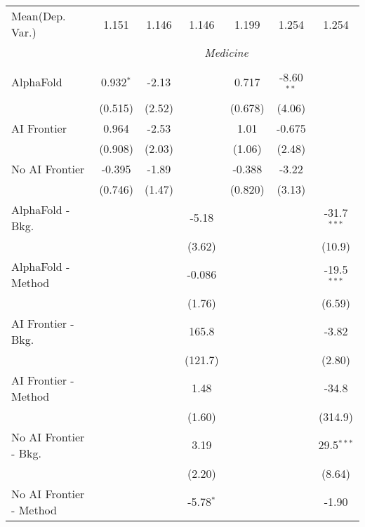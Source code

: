 \begin{tabular}{lcccccc}
Mean(Dep. Var.) & 1.151 & 1.146 & 1.146 & 1.199 & 1.254 & 1.254 \\
 & \multicolumn{6}{c}{\textit{Medicine}} \\ \\
   AlphaFold               & 0.932$^{*}$ & -2.13  &             & 0.717   & -8.60$^{**}$ &   \\   
                           & (0.515)     & (2.52) &             & (0.678) & (4.06)       &   \\   
   AI Frontier             & 0.964       & -2.53  &             & 1.01    & -0.675       &   \\   
                           & (0.908)     & (2.03) &             & (1.06)  & (2.48)       &   \\   
   No AI Frontier          & -0.395      & -1.89  &             & -0.388  & -3.22        &   \\   
                           & (0.746)     & (1.47) &             & (0.820) & (3.13)       &   \\   
   AlphaFold - Bkg.        &             &        & -5.18       &         &              & -31.7$^{***}$\\   
                           &             &        & (3.62)      &         &              & (10.9)\\   
   AlphaFold - Method      &             &        & -0.086      &         &              & -19.5$^{***}$\\   
                           &             &        & (1.76)      &         &              & (6.59)\\   
   AI Frontier - Bkg.      &             &        & 165.8       &         &              & -3.82\\   
                           &             &        & (121.7)     &         &              & (2.80)\\   
   AI Frontier - Method    &             &        & 1.48        &         &              & -34.8\\   
                           &             &        & (1.60)      &         &              & (314.9)\\   
   No AI Frontier - Bkg.   &             &        & 3.19        &         &              & 29.5$^{***}$\\   
                           &             &        & (2.20)      &         &              & (8.64)\\   
   No AI Frontier - Method &             &        & -5.78$^{*}$ &         &              & -1.90\\   

\end{tabular}
